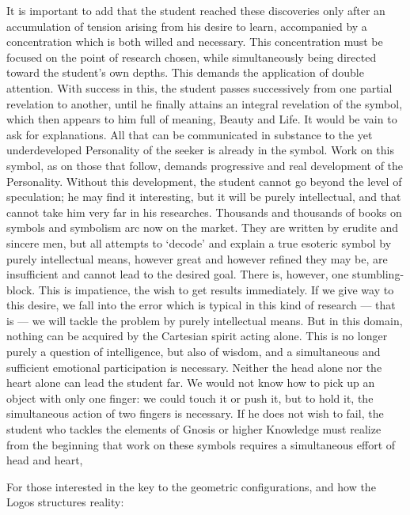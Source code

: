 \begin{quotex}
It is important to add that the student reached these discoveries only after an accumulation of tension arising from his desire to learn, accompanied by a concentration which is both willed and necessary. This concentration must be focused on the point of research chosen, while simultaneously being directed toward the student's own depths. This demands the application of double attention. With success in this, the student passes successively from one partial revelation to another, until he finally attains an integral revelation of the symbol, which then appears to him full of meaning, Beauty and Life. It would be vain to ask for explanations. All that can be communicated in substance to the yet underdeveloped Personality of the seeker is already in the symbol. Work on this symbol, as on those that follow, demands progressive and real development of the Personality. Without this development, the student cannot go beyond the level of speculation; he may find it interesting, but it will be purely intellectual, and that cannot take him very far in his researches. Thousands and thousands of books on symbols and symbolism arc now on the market. They are written by erudite and sincere men, but all attempts to `decode' and explain a true esoteric symbol by purely intellectual means, however great and however refined they may be, are insufficient and cannot lead to the desired goal. There is, however, one stumbling-block. This is impatience, the wish to get results immediately. If we give way to this desire, we fall into the error which is typical in this kind of research --- that is --- we will tackle the problem by purely intellectual means. But in this domain, nothing can be acquired by the Cartesian spirit acting alone. This is no longer purely a question of intelligence, but also of wisdom, and a simultaneous and sufficient emotional participation is necessary. Neither the head alone nor the heart alone can lead the student far. We would not know how to pick up an object with only one finger: we could touch it or push it, but to hold it, the simultaneous action of two fingers is necessary. If he does not wish to fail, the student who tackles the elements of Gnosis or higher Knowledge must realize from the beginning that work on these symbols requires a simultaneous effort of head and heart,
\end{quotex}


For those interested in the key to the geometric configurations, and how the Logos structures reality:

